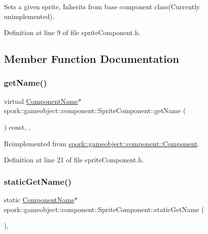 Sets a given sprite, Inherits from base component class(\+Currently unimplemented). 

Definition at line 9 of file sprite\+Component.\+h.



\subsection{Member Function Documentation}
\mbox{\label{classspork_1_1gameobject_1_1component_1_1_sprite_component_a3c3b5324ab563b6e759e07fd7e11b96c}} 
\subsubsection{\texorpdfstring{get\+Name()}{getName()}}
{\footnotesize\ttfamily virtual \hyperlink{structspork_1_1gameobject_1_1component_1_1_component_name}{Component\+Name}$\ast$ spork\+::gameobject\+::component\+::\+Sprite\+Component\+::get\+Name (\begin{DoxyParamCaption}{ }\end{DoxyParamCaption}) const\hspace{0.3cm}{\ttfamily [inline]}, {\ttfamily [override]}, {\ttfamily [virtual]}}



Reimplemented from \hyperlink{classspork_1_1gameobject_1_1component_1_1_component_ac47356483f2a091e46ad7aaf99cb1595}{spork\+::gameobject\+::component\+::\+Component}.



Definition at line 21 of file sprite\+Component.\+h.

\mbox{\label{classspork_1_1gameobject_1_1component_1_1_sprite_component_a006e88cc9c1bc9e5640abec4bdb22824}} 
\subsubsection{\texorpdfstring{static\+Get\+Name()}{staticGetName()}}
{\footnotesize\ttfamily static \hyperlink{structspork_1_1gameobject_1_1component_1_1_component_name}{Component\+Name}$\ast$ spork\+::gameobject\+::component\+::\+Sprite\+Component\+::static\+Get\+Name (\begin{DoxyParamCaption}{ }\end{DoxyParamCaption})\hspace{0.3cm}{\ttfamily [inline]}, {\ttfamily [static]}}



